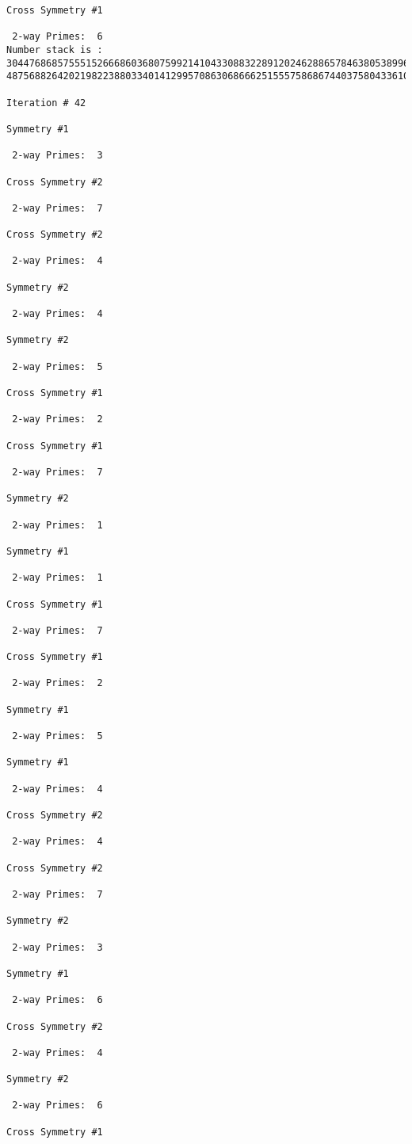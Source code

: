 {{{{\begin{verbatim}
Cross Symmetry #1

 2-way Primes: 	6
Number stack is :
30447686857555152666860368075992141043308832289120246288657846380538996794608835958544046240163340857
48756882642021982238803340141299570863068666251555758686744037580433610426404458595388064976998350836

Iteration #	42

Symmetry #1

 2-way Primes: 	3

Cross Symmetry #2

 2-way Primes: 	7

Cross Symmetry #2

 2-way Primes: 	4

Symmetry #2

 2-way Primes: 	4

Symmetry #2

 2-way Primes: 	5

Cross Symmetry #1

 2-way Primes: 	2

Cross Symmetry #1

 2-way Primes: 	7

Symmetry #2

 2-way Primes: 	1

Symmetry #1

 2-way Primes: 	1

Cross Symmetry #1

 2-way Primes: 	7

Cross Symmetry #1

 2-way Primes: 	2

Symmetry #1

 2-way Primes: 	5

Symmetry #1

 2-way Primes: 	4

Cross Symmetry #2

 2-way Primes: 	4

Cross Symmetry #2

 2-way Primes: 	7

Symmetry #2

 2-way Primes: 	3

Symmetry #1

 2-way Primes: 	6

Cross Symmetry #2

 2-way Primes: 	4

Symmetry #2

 2-way Primes: 	6

Cross Symmetry #1


\end{verbatim}}}}}
